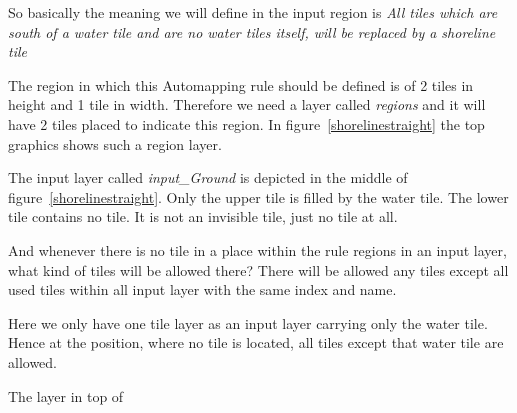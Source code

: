 So basically the meaning we will define in the input region is 
\emph{All tiles which are south of a water tile and are no water tiles itself,
will be replaced by a shoreline tile}

The region in which this Automapping rule should be defined is of 2 tiles in height and 
1 tile in width. Therefore we need a layer called \emph{regions} and it will have 2 tiles placed
to indicate this region. In figure~\ref{shorelinestraight} the top graphics shows such a region
layer.

The input layer called \emph{input\_Ground} is depicted in the middle of 
figure~\ref{shorelinestraight}. Only the upper tile is filled by the water
tile. The lower tile contains no tile. It is not an invisible tile, just no
tile at all. 

And whenever there is no tile in a place within the rule regions in an input layer,
what kind of tiles will be allowed there? There will be allowed any tiles except 
all used tiles within all input layer with the same index and name.

Here we only have one tile layer as an input layer carrying only the water tile.
Hence at the position, where no tile is located, all tiles except that water tile
are allowed.

The layer in top of 
